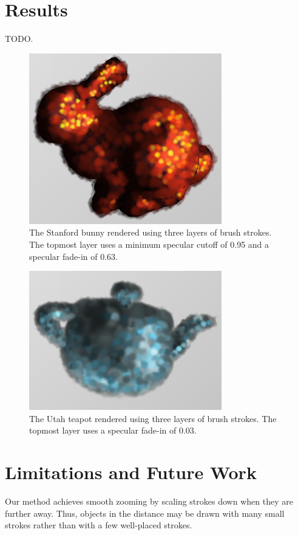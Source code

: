 \documentclass[conference]{acmsiggraph}
\begin{document}
\section{Results}

TODO.

\begin{figure}[ht]
  \centering
  \includegraphics[width=3.3in]{images/bunny_with_fade_in}
  \caption{The Stanford bunny rendered using three layers of brush strokes.
           The topmost layer uses a minimum specular cutoff of 0.95 and a
           specular fade-in of 0.63.}
\end{figure}

\begin{figure}[ht]
  \centering
  \includegraphics[width=3.3in]{images/teapot_with_background}
  \caption{The Utah teapot rendered using three layers of brush strokes.
           The topmost layer uses a specular fade-in of 0.03.}
\end{figure}


\section{Limitations and Future Work}

Our method achieves smooth zooming by scaling strokes down when they are
further away. Thus, objects in the distance may be drawn with many small
strokes rather than with a few well-placed strokes.
\end{document}
